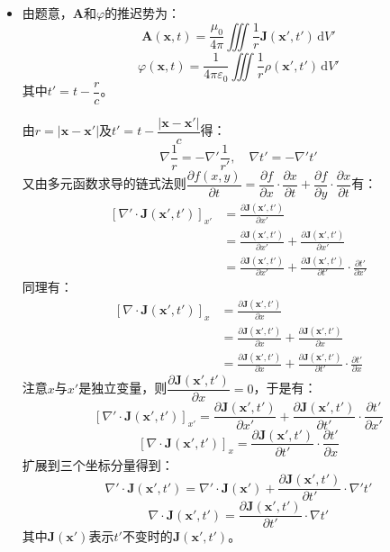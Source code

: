 \documentclass[a4paper,fontset=none]{ctexart}
\begin{document}
\begin{itemize}
        \item[9.]
        由题意，$\bm{A}$和$\varphi$的推迟势为：
        \[
            \bm{A}(\bm{x}, t) = \frac{\mu_0}{4\pi} \iiint \frac{1}{r}\bm{J}(\bm{x}', t')\,\mathrm{d}V'
        \]
        \[
            \varphi(\bm{x}, t) = \frac{1}{4\pi\varepsilon_0} \iiint \frac{1}{r}\rho(\bm{x}', t')\,\mathrm{d}V'
        \]
        其中$t'=t-\dfrac{r}{c}$。

        由$r=|\bm{x}-\bm{x'}|$及$t'=t-\dfrac{|\bm{x}-\bm{x}'|}{c}$得：
        \[
            \nabla \frac{1}{r} = -\nabla' \frac{1}{r'},\quad \nabla t' = -\nabla' t'
        \]
        又由多元函数求导的链式法则$\dfrac{\partial f(x,y)}{\partial t}=\dfrac{\partial f}{\partial x}\cdot\dfrac{\partial x}{\partial t}+\dfrac{\partial f}{\partial y}\cdot\dfrac{\partial x}{\partial t}$有：
        \begin{align*}
            \left[\nabla' \cdot \bm{J}(\bm{x}', t')\right]_{x'}
            &= \frac{\partial\bm{J}(\bm{x}', t')}{\partial x'} \\
            &= \frac{\partial\bm{J}(\bm{x}', t')}{\partial x'} + \frac{\partial\bm{J}(\bm{x}', t')}{\partial x'} \\
            &= \frac{\partial\bm{J}(\bm{x}', t')}{\partial x'} + \frac{\partial\bm{J}(\bm{x}', t')}{\partial t'} \cdot \frac{\partial t'}{\partial x'}
        \end{align*}
        同理有：
        \begin{align*}
            \left[\nabla \cdot \bm{J}(\bm{x}', t')\right]_x
            &= \frac{\partial\bm{J}(\bm{x}', t')}{\partial x} \\
            &= \frac{\partial\bm{J}(\bm{x}', t')}{\partial x} + \frac{\partial\bm{J}(\bm{x}', t')}{\partial x} \\
            &= \frac{\partial\bm{J}(\bm{x}', t')}{\partial x} + \frac{\partial\bm{J}(\bm{x}', t')}{\partial t'} \cdot \frac{\partial t'}{\partial x}
        \end{align*}
        注意$x$与$x'$是独立变量，则$\dfrac{\partial\bm{J}(\bm{x}', t')}{\partial x}=0$，于是有：
        \[
            \left[\nabla' \cdot \bm{J}(\bm{x}', t')\right]_{x'} = \frac{\partial\bm{J}(\bm{x}', t')}{\partial x'} + \frac{\partial\bm{J}(\bm{x}', t')}{\partial t'} \cdot \frac{\partial t'}{\partial x'}
        \]
        \[
            \left[\nabla \cdot \bm{J}(\bm{x}', t')\right]_x = \frac{\partial\bm{J}(\bm{x}', t')}{\partial t'} \cdot \frac{\partial t'}{\partial x}
        \]
        扩展到三个坐标分量得到：
        \[
            \nabla' \cdot \bm{J}(\bm{x}', t') = \nabla' \cdot \bm{J}(\bm{x}') + \frac{\partial\bm{J}(\bm{x}', t')}{\partial t'} \cdot \nabla't'
        \]
        \[
            \nabla \cdot \bm{J}(\bm{x}', t') = \frac{\partial\bm{J}(\bm{x}', t')}{\partial t'} \cdot \nabla t'
        \]
        其中$\bm{J}(\bm{x}')$表示$t'$不变时的$\bm{J}(\bm{x}', t')$。


\end{itemize}
\end{document}
